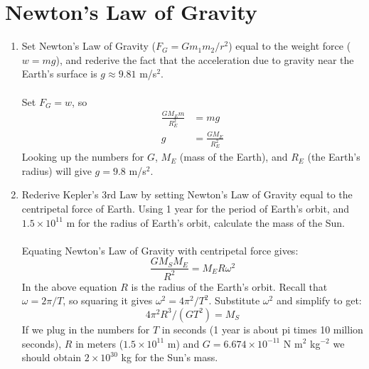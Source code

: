 \documentclass[10pt]{article}
\begin{document}
\section{Newton's Law of Gravity}
\begin{enumerate}
\item Set Newton's Law of Gravity ($F_G = G m_1 m_2 / r^2$) equal to the weight force ($w = mg$), and rederive the fact that the acceleration due to gravity near the Earth's surface is $g\approx 9.81$ m/s$^2$. \\ \\
Set $F_G = w$, so 
\begin{align}
\frac{G M_E m}{R_E^2} &= mg \\
g &= \frac{G M_E}{R_E^2}
\end{align}
Looking up the numbers for $G$, $M_E$ (mass of the Earth), and $R_E$ (the Earth's radius) will give $g=9.8$ m/s$^2$.
\item Rederive Kepler's 3rd Law by setting Newton's Law of Gravity equal to the centripetal force of Earth. Using 1 year for the period of Earth's orbit, and $1.5 \times 10^{11}$ m for the radius of Earth's orbit, calculate the mass of the Sun. \\ \\
Equating Newton's Law of Gravity with centripetal force gives:
\begin{equation}
\frac{G M_S M_E}{R^2} = M_E R \omega^2
\end{equation}
In the above equation $R$ is the radius of the Earth's orbit.  Recall that $\omega = 2\pi/T$, so squaring it gives $\omega^2 = 4\pi^2/T^2$.  Substitute $\omega^2$ and simplify to get:
\begin{equation}
4\pi^2 R^3/(GT^2) = M_S 
\end{equation}
If we plug in the numbers for $T$ in seconds (1 year is about pi times 10 million seconds), $R$ in meters ($1.5 \times 10^{11}$ m) and $G = 6.674 \times 10^{-11}$ N m$^2$ kg$^{-2}$ we should obtain $2 \times 10^{30}$ kg for the Sun's mass.
\end{enumerate}
\end{document}
